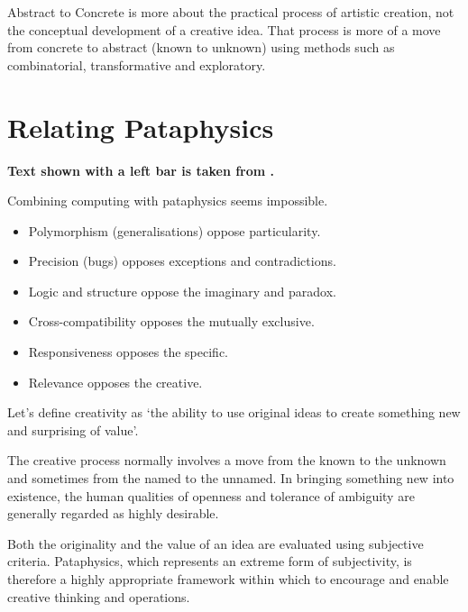 \begin{draft}
  Abstract to Concrete is more about the practical process of artistic creation, not the conceptual development of a creative idea. That process is more of a move from concrete to abstract (known to unknown) using methods such as combinatorial, transformative and exploratory.
\end{draft}


\section{Relating Pataphysics}

\textbf{Text shown with a left bar is taken from \autocite{Hugill2013d}.}

\begin{draft}
  Combining computing with pataphysics seems impossible.

  \begin{itemize}
    \item Polymorphism (generalisations) oppose particularity.
    \item Precision (bugs) opposes exceptions and contradictions.
    \item Logic and structure oppose the imaginary and paradox.
    \item Cross-compatibility opposes the mutually exclusive.
    \item Responsiveness opposes the specific.
    \item Relevance opposes the creative.
  \end{itemize}
\end{draft}

Let's define creativity as `the ability to use original ideas to create something new and surprising of value'.

\begin{leftbar}
The creative process normally involves a move from the known to the unknown and sometimes from the named to the unnamed. In bringing something new into existence, the human qualities of openness and tolerance of ambiguity are generally regarded as highly desirable.
\end{leftbar}

\begin{leftbar}
Both the originality and the value of an idea are evaluated using subjective criteria. Pataphysics, which represents an extreme form of subjectivity, is therefore a highly appropriate framework within which to encourage and enable creative thinking and operations.
\end{leftbar}

